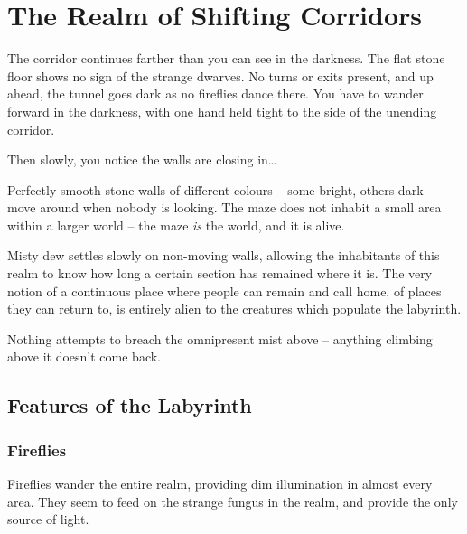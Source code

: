 \section{The Realm of Shifting Corridors}\label{shiftingcorridors}


\begin{multicols}{2}

\begin{boxtext}
  The corridor continues farther than you can see in the darkness.
  The flat stone floor shows no sign of the strange dwarves.
  No turns or exits present, and up ahead, the tunnel goes dark as no fireflies dance there.
  You have to wander forward in the darkness, with one hand held tight to the side of the unending corridor.

  Then slowly, you notice the walls are closing in\ldots

\end{boxtext}

\noindent
Perfectly smooth stone walls of different colours -- some bright, others dark -- move around when nobody is looking.
The maze does not inhabit a small area within a larger world -- the maze \emph{is} the world, and it is alive.

Misty dew settles slowly on non-moving walls, allowing the inhabitants of this realm to know how long a certain section has remained where it is.
The very notion of a continuous place where people can remain and call home, of places they can return to, is entirely alien to the creatures which populate the labyrinth.

Nothing attempts to breach the omnipresent mist above -- anything climbing above it doesn't come back.

\encLabyrinth

\subsection{Features of the Labyrinth}

\subsubsection{Fireflies}

Fireflies wander the entire realm, providing dim illumination in almost every area.
They seem to feed on the strange fungus in the realm, and provide the only source of light.


\end{multicols}
